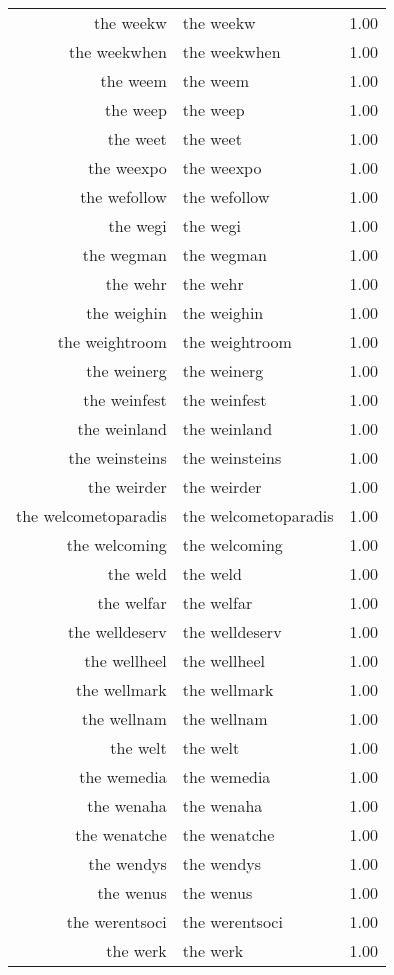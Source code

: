 \begin{table}[ht]
\begin{tabular}{rlr}
  the weekw & the weekw & 1.00 \\ 
  the weekwhen & the weekwhen & 1.00 \\ 
  the weem & the weem & 1.00 \\ 
  the weep & the weep & 1.00 \\ 
  the weet & the weet & 1.00 \\ 
  the weexpo & the weexpo & 1.00 \\ 
  the wefollow & the wefollow & 1.00 \\ 
  the wegi & the wegi & 1.00 \\ 
  the wegman & the wegman & 1.00 \\ 
  the wehr & the wehr & 1.00 \\ 
  the weighin & the weighin & 1.00 \\ 
  the weightroom & the weightroom & 1.00 \\ 
  the weinerg & the weinerg & 1.00 \\ 
  the weinfest & the weinfest & 1.00 \\ 
  the weinland & the weinland & 1.00 \\ 
  the weinsteins & the weinsteins & 1.00 \\ 
  the weirder & the weirder & 1.00 \\ 
  the welcometoparadis & the welcometoparadis & 1.00 \\ 
  the welcoming & the welcoming & 1.00 \\ 
  the weld & the weld & 1.00 \\ 
  the welfar & the welfar & 1.00 \\ 
  the welldeserv & the welldeserv & 1.00 \\ 
  the wellheel & the wellheel & 1.00 \\ 
  the wellmark & the wellmark & 1.00 \\ 
  the wellnam & the wellnam & 1.00 \\ 
  the welt & the welt & 1.00 \\ 
  the wemedia & the wemedia & 1.00 \\ 
  the wenaha & the wenaha & 1.00 \\ 
  the wenatche & the wenatche & 1.00 \\ 
  the wendys & the wendys & 1.00 \\ 
  the wenus & the wenus & 1.00 \\ 
  the werentsoci & the werentsoci & 1.00 \\ 
  the werk & the werk & 1.00 \\ 

\end{tabular}
\end{table}
